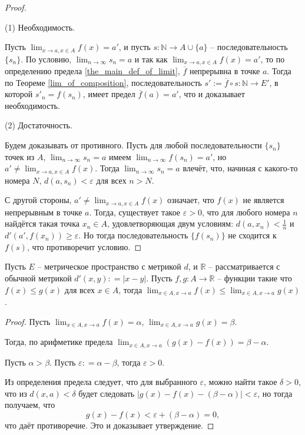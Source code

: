 \begin{proof}~

(1) Необходимость. 

Пусть $\lim_{x \to a, x \in A}f(x) = a'$, и пусть $s:\mathbb{N} \to {A}\cup \{a\}$ -- последовательность $\{s_n\}$. По условию, $\lim_{n \to \infty }s_n = a$ и так как $\lim_{x \to a, x \in A}f(x) = a'$, то по определению предела \ref{the_main_def_of_limit}, $\overline{f}$ непрерывна в точке $a$. Тогда по Теореме \ref{lim_of_composition}, последовательность $s':=\overline{f} \circ s: \mathbb{N} \to E'$, в которой $s'_n = f(s_n)$, имеет предел $\overline{f}(a) = a'$, что и доказывает необходимость.

(2) Достаточность.

Будем доказывать от противного. Пусть для любой последовательности $\{s_n\}$ точек из $A$, $\lim_{n \to \infty} s_n = a$ имеем $\lim_{n \to \infty}f(s_n) = a'$, но $a' \ne \lim_{x \to a, x\in A}f(x).$ Тогда  $\lim_{n \to \infty} s_n = a$ влечёт, что, начиная с какого-то номера $N$, $d(a,s_n) < \varepsilon$ для всех $n > N$.

С другой стороны, $a' \ne \lim_{x \to a, x\in A}f(x)$ означает, что $f(x)$ не является непрерывным в точке $a$. Тогда, существует такое $\varepsilon >0$, что для любого номера $n$ найдётся такая точка $x_n \in A$, удовлетворяющая двум условиям: $d(a,x_n) < \frac{1}{n}$ и $d'(a',f(x_n))\ge \varepsilon$. Но тогда последовательность $\{f(s_n)\}$ не сходится к $f(s)$, что противоречит условию.
\end{proof}


\begin{theorem}\label{f<g=>lim}
  Пусть $E$ -- метрическое пространство с метрикой $d$, и $\mathbb{R}$ -- рассматривается с обычной метрикой $d'(x,y): = |x-y|$.  Пусть $f,g:A \to \mathbb{R}$ -- функции такие что $f(x) \le g(x)$ для всех $x \in A$, тогда $\lim_{x\in A, x \to a}f(x) \le \lim_{x \in A, x \to a}g(x)$.
\end{theorem}

\begin{proof}
Пусть $\lim_{x\in A, x \to a}f(x) = \alpha$, $\lim_{x\in A, x \to a}g(x) = \beta$.

Тогда, по арифметике предела $\lim_{x\in A, x \to a}(g(x) - f(x)) = \beta - \alpha.$

Пусть $\alpha > \beta$. Пусть $\varepsilon : = \alpha - \beta$, тогда $\varepsilon >0$.

Из определения предела следует, что для выбранного $\varepsilon$, можно найти такое $\delta>0$, что из $d(x,a)<\delta$ будет следовать $|g(x) - f(x) - (\beta - \alpha)| < \varepsilon$, но тогда получаем, что
\[
 g(x) - f(x) < \varepsilon + (\beta - \alpha) = 0,
\]
что даёт противоречие. Это и доказывает утверждение.
\end{proof}